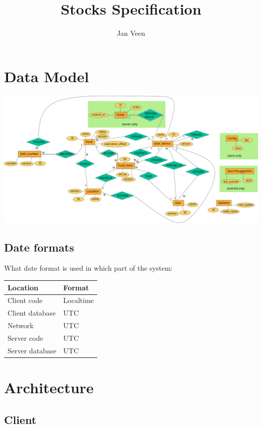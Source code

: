\documentclass[12pt]{report}
\begin{document}
\title{Stocks Specification}			%
\author{Jan Veen}
\maketitle				%
\cleardoublepage
{}
\tableofcontents

\chapter{Data Model}

\includegraphics[width=\linewidth]{diagrams/ER-diagram.png}

\section{Date formats}
What date format is used in which part of the system:

\begin{tabular}{l l}
Location & Format \\\hline
Client code & Localtime \\\hline
Client database & UTC \\\hline
Network & UTC \\\hline
Server code & UTC \\\hline
Server database & UTC \\\hline
\end{tabular}

\chapter{Architecture}

\section{Client}
\end{document}
